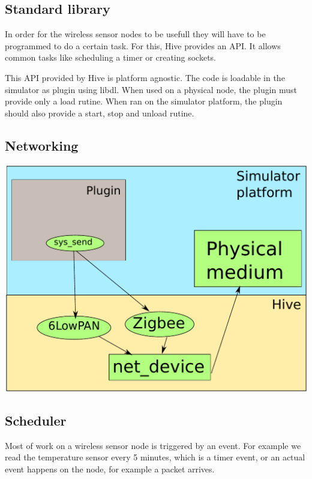 
\subsection{Standard library}

In order for the wireless sensor nodes to be usefull they will have to be
programmed to do a certain task. For this, Hive provides an API. It allows
common tasks like scheduling a timer or creating sockets. 

This API provided by Hive is platform agnostic. The code is loadable in the
simulator as plugin using libdl. When used on a physical node, the plugin must
provide only a load rutine. When ran on the simulator platform, the plugin
should also provide a start, stop and unload rutine.

\subsection{Networking}

\includegraphics[scale=0.75]{img/networking.pdf}

\subsection{Scheduler}

Most of work on a wireless sensor node is triggered by an event. For example
we read the temperature sensor every 5 minutes, which is a timer event, or an
actual event happens on the node, for example a packet arrives.

